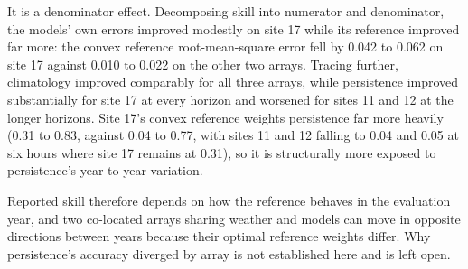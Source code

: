 It is a denominator effect. Decomposing skill into numerator and
denominator, the models' own errors improved modestly on site 17 while
its reference improved far more: the convex reference root-mean-square
error fell by 0.042 to 0.062 on site 17 against 0.010 to 0.022 on the
other two arrays. Tracing further, climatology improved comparably for
all three arrays, while persistence improved substantially for site 17
at every horizon and worsened for sites 11 and 12 at the longer
horizons. Site 17's convex reference weights persistence far more
heavily (0.31 to 0.83, against 0.04 to 0.77, with sites 11 and 12
falling to 0.04 and 0.05 at six hours where site 17 remains at 0.31), so it is structurally more
exposed to persistence's year-to-year variation.

Reported skill therefore depends on how the reference behaves in the
evaluation year, and two co-located arrays sharing weather and models
can move in opposite directions between years because their optimal
reference weights differ. Why persistence's accuracy diverged by array
is not established here and is left open.
